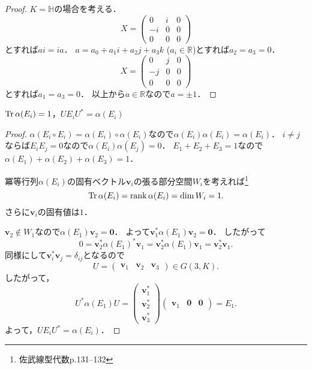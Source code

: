\documentclass[a4paper, leqno]{ltjsreport}
\begin{document}
\begin{proof}
  \(K = \mathbb{H}\)の場合を考える．
  \[
  X =
  \begin{pmatrix}
    0 & i & 0 \\
    -i & 0 & 0 \\
    0 & 0 & 0
  \end{pmatrix}
  \]
  とすれば\(ai = ia\)．
  \(a = a_0 + a_1 i + a_2 j + a_3 k\) (\(a_i \in \mathbb{R}\))とすれば\(a_2 = a_3 = 0\)．
  \[
  X =
  \begin{pmatrix}
    0 & j & 0 \\
    -j & 0 & 0 \\
    0 & 0 & 0
  \end{pmatrix}
  \]
  とすれば\(a_1 = a_3 = 0\)．
  以上から\(a \in \mathbb{R}\)なので\(a = \pm 1\)．
\end{proof}

\begin{screen}
  \(\operatorname{Tr} \alpha(E_i) = 1\)，\(U E_i U^\ast = \alpha(E_i)\)
\end{screen}
\begin{proof}
  \(\alpha(E_i \circ E_i) = \alpha(E_i) \circ \alpha(E_i)\)なので\(\alpha(E_i)\alpha(E_i) = \alpha(E_i)\)．
  \(i \neq j\)ならば\(E_i E_j = 0\)なので\(\alpha(E_i) \alpha(E_j) = 0\)．
  \(E_1 + E_2 + E_3 = 1\)なので\(\alpha(E_1) + \alpha(E_2) + \alpha(E_3) = 1\)．

  冪等行列\(\alpha(E_i)\)の固有ベクトル\(\boldsymbol{v}_i\)の張る部分空間\(W_i\)を考えれば\footnote{佐武線型代数p.131--132}
  \[ \operatorname{Tr} \alpha(E_i) = \operatorname{rank} \alpha(E_i) = \dim W_i = 1 . \]
  さらに\(\boldsymbol{v}_i\)の固有値は\(1\)．

  \(\boldsymbol{v}_2 \not\in W_1\)なので\(\alpha(E_1) \boldsymbol{v}_2 = \boldsymbol{0}\)．
  よって\(\boldsymbol{v}_1^\ast \alpha(E_1) \boldsymbol{v}_2 = \boldsymbol{0}\)．
  したがって
  \[
  0 = \boldsymbol{v}_2^\ast \alpha(E_1)^\ast \boldsymbol{v}_1
  = \boldsymbol{v}_2^\ast \alpha(E_1) \boldsymbol{v}_1 = \boldsymbol{v}_2^\ast \boldsymbol{v}_1 .
  \]
  同様にして\(\boldsymbol{v}_i^\ast \boldsymbol{v}_j = \delta_{ij}\)となるので
  \[
  U =
  \begin{pmatrix}
    \boldsymbol{v}_1 & \boldsymbol{v}_2 & \boldsymbol{v}_3
  \end{pmatrix}
  \in G(3, K) .
  \]
  したがって，
  \[
  U^\ast \alpha(E_1) U =
  \begin{pmatrix}
    \boldsymbol{v}_1^\ast \\ \boldsymbol{v}_2^\ast \\ \boldsymbol{v}_3^\ast
  \end{pmatrix}
  \begin{pmatrix}
    \boldsymbol{v}_1 & \boldsymbol{0} & \boldsymbol{0}
  \end{pmatrix}
  = E_1 .
  \]
  よって，\(U E_i U^\ast = \alpha(E_i)\)．
\end{proof}
\end{document}
